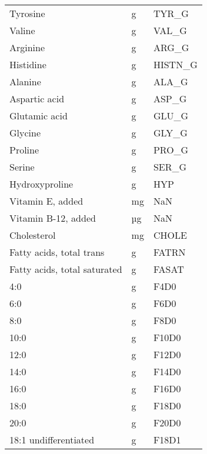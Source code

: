 \documentclass[]{scrartcl}
\begin{document}
\begin{longtable}{lll}
	Tyrosine                           &     g &       TYR\_G \\
	Valine                             &     g &       VAL\_G \\
	Arginine                           &     g &       ARG\_G \\
	Histidine                          &     g &     HISTN\_G \\
	Alanine                            &     g &       ALA\_G \\
	Aspartic acid                      &     g &       ASP\_G \\
	Glutamic acid                      &     g &       GLU\_G \\
	Glycine                            &     g &       GLY\_G \\
	Proline                            &     g &       PRO\_G \\
	Serine                             &     g &       SER\_G \\
	Hydroxyproline                     &     g &         HYP \\
	Vitamin E, added                   &    mg &         NaN \\
	Vitamin B-12, added                &    µg &         NaN \\
	Cholesterol                        &    mg &       CHOLE \\
	Fatty acids, total trans           &     g &       FATRN \\
	Fatty acids, total saturated       &     g &       FASAT \\
	4:0                                &     g &        F4D0 \\
	6:0                                &     g &        F6D0 \\
	8:0                                &     g &        F8D0 \\
	10:0                               &     g &       F10D0 \\
	12:0                               &     g &       F12D0 \\
	14:0                               &     g &       F14D0 \\
	16:0                               &     g &       F16D0 \\
	18:0                               &     g &       F18D0 \\
	20:0                               &     g &       F20D0 \\
	18:1 undifferentiated              &     g &       F18D1 \\

\end{longtable}
\end{document}
